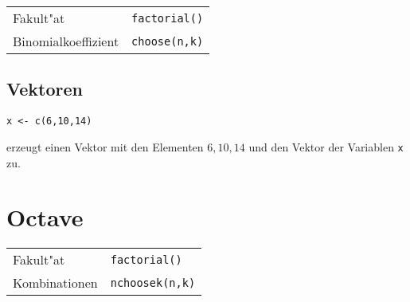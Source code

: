 \documentclass[ngerman, a4paper, 10pt, twocolumn, DIV20, headings=small]{scrartcl}
\begin{document}
\begin{tabular}{l l}
  Fakult"at & \verb|factorial()| \\
  Binomialkoeffizient & \verb|choose(n,k)| \\
\end{tabular}

\subsection{Vektoren}
\label{sec:r-vektoren}

\begin{verbatim}
x <- c(6,10,14)
\end{verbatim}
erzeugt einen Vektor mit den Elementen $6, 10, 14$ und den Vektor der Variablen \verb|x| zu.

\section{Octave}
\label{sec:octave}

\begin{tabular}{l l}
  Fakult"at & \verb|factorial()| \\
  Kombinationen & \verb|nchoosek(n,k)| \\
\end{tabular}
\end{document}
